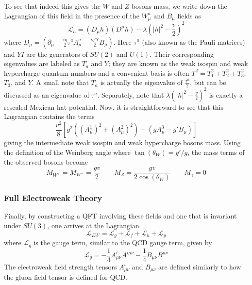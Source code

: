 To see that indeed this gives the $W$ and $Z$ bosons mass, we write down the Lagrangian of this field in the presence of the $W^a_\mu$ and $B_\mu$ fields as
\begin{equation}
\mathcal{L}_{h} = (D_{\mu}h)(D^\mu h) - \lambda\left(|h|^2- \frac{v}{2}\right)^2
\label{eq:higg-field-lagrangian}
\end{equation}
where $D_\mu = (\partial_\mu - \frac{ig}{2}\tau^a A^a_\mu - \frac{ig'Y}{2}B_\mu)$. Here $\tau^a$ (also known as the Pauli matrices) and $YI$ are the generators of $SU(2)$ and $U(1)$. Their corresponding eigenvalues are labeled as $T_a$ and $Y$; they are known as the weak isospin and weak hypercharge quantum numbers and a convenient basis is often $T^2 = T_1^2 + T_2^2 + T_3^2$, $T_3$, and $Y$. A small note that $T_a$ is actually the eigenvalue of $\frac{\tau^a}{2}$, but can be discussed as an eigenvalue of $\tau^a$. Separately, note that $\lambda\left(|h|^2- \frac{v}{2}\right)^2$ is exactly a rescaled Mexican hat potential. Now, it is straightforward to see that this Lagrangian contains the terms
\begin{equation}
\frac{v^2}{8}\left[g^2\left((A^{1}_{\mu})^2 + (A^{2}_{\mu})^2\right) + (gA_{\mu}^3 - g' B_{\mu})\right]
\end{equation}
giving the intermediate weak isospin and weak hypercharge bosons mass. Using the definition of the Weinberg angle where $\tan(\theta_W) = g'/g$, the mass terms of the observed bosons become
\begin{equation}
M_{W^+} = M_{W^-} = \frac{gv}{2} \quad\quad M_{Z} = \frac{gv}{2\cos(\theta_{W})} \quad\quad M_{\gamma} = 0
\end{equation}

\subsubsection{Full Electroweak Theory}

Finally, by constructing a QFT involving these fields and one that is invariant under $SU(3)$, one arrives at the Lagrangian
\begin{equation}
\mathcal{L}_{EW} = \mathcal{L}_{g} + \mathcal{L}_{f} + \mathcal{L}_{h} + \mathcal{L}_{y}
\end{equation}
where $\mathcal{L}_g$ is the gauge term, similar to the QCD gauge term, given by
\begin{equation}
\mathcal{L}_g = -\frac{1}{4}A^i_{\mu\nu}A^{i\mu\nu} - \frac{1}{4} B_{\mu\nu} B^{\mu\nu}
\end{equation}
The electroweak field strength tensors $A^i_{\mu\nu}$ and $B_{\mu\nu}$ are defined similarly to how the gluon field tensor is defined for QCD.

